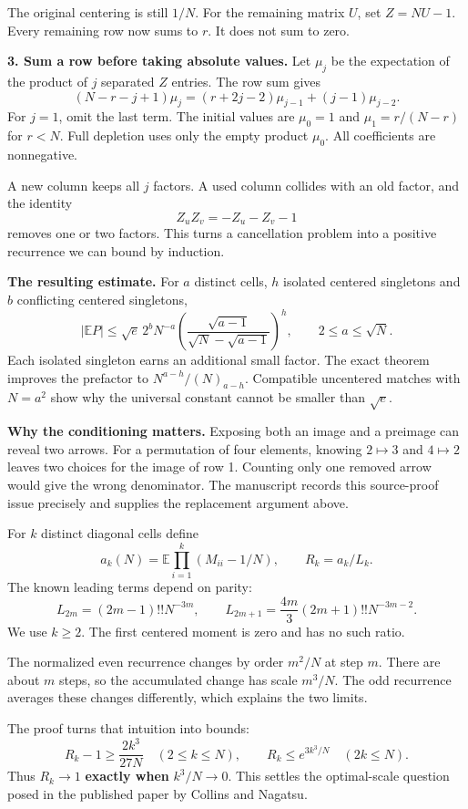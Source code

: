 \documentclass[11pt]{article}
\newcommand{\E}{\mathbb E}
\newcommand{\pagetitle}[2]{\noindent{\small\sffamily\color{teal}#1}\par\vspace{5pt}\noindent{\LARGE\bfseries\color{ink}#2}\par\vspace{12pt}}
\begin{document}
The original centering is still $1/N$. For the remaining matrix $U$, set $Z=NU-1$. Every remaining row now sums to $r$. It does not sum to zero.

\textbf{3. Sum a row before taking absolute values.} Let $\mu_j$ be the expectation of the product of $j$ separated $Z$ entries. The row sum gives
\[
(N-r-j+1)\mu_j
=(r+2j-2)\mu_{j-1}+(j-1)\mu_{j-2}.
\]
For $j=1$, omit the last term. The initial values are $\mu_0=1$ and $\mu_1=r/(N-r)$ for $r<N$. Full depletion uses only the empty product $\mu_0$. All coefficients are nonnegative.

A new column keeps all $j$ factors. A used column collides with an old factor, and the identity
\[
Z_uZ_v=-Z_u-Z_v-1
\]
removes one or two factors. This turns a cancellation problem into a positive recurrence we can bound by induction.

\textbf{The resulting estimate.} For $a$ distinct cells, $h$ isolated centered singletons and $b$ conflicting centered singletons,
\[
|\E P|\le\sqrt e\,2^bN^{-a}
\left(\frac{\sqrt{a-1}}{\sqrt N-\sqrt{a-1}}\right)^h,
\qquad 2\le a\le\sqrt N.
\]
Each isolated singleton earns an additional small factor. The exact theorem improves the prefactor to $N^{a-h}/(N)_{a-h}$. Compatible uncentered matches with $N=a^2$ show why the universal constant cannot be smaller than $\sqrt e$.

\textbf{Why the conditioning matters.} Exposing both an image and a preimage can reveal two arrows. For a permutation of four elements, knowing $2\mapsto3$ and $4\mapsto2$ leaves two choices for the image of row 1. Counting only one removed arrow would give the wrong denominator. The manuscript records this source-proof issue precisely and supplies the replacement argument above.

\newpage
\pagetitle{THE FIRST TRANSITION}{Why the order enters as a cube}

For $k$ distinct diagonal cells define
\[
a_k(N)=\E\prod_{i=1}^k(M_{ii}-1/N),\qquad R_k=a_k/L_k.
\]
The known leading terms depend on parity:
\[
L_{2m}=(2m-1)!!N^{-3m},\qquad
L_{2m+1}=\frac{4m}{3}(2m+1)!!N^{-3m-2}.
\]
We use $k\ge2$. The first centered moment is zero and has no such ratio.

The normalized even recurrence changes by order $m^2/N$ at step $m$. There are about $m$ steps, so the accumulated change has scale $m^3/N$. The odd recurrence averages these changes differently, which explains the two limits.

The proof turns that intuition into bounds:
\[
R_k-1\ge\frac{2k^3}{27N}\quad(2\le k\le N),\qquad
R_k\le e^{3k^3/N}\quad(2k\le N).
\]
Thus $R_k\to1$ \textbf{exactly when} $k^3/N\to0$. This settles the optimal-scale question posed in the published paper by Collins and Nagatsu.
\end{document}
